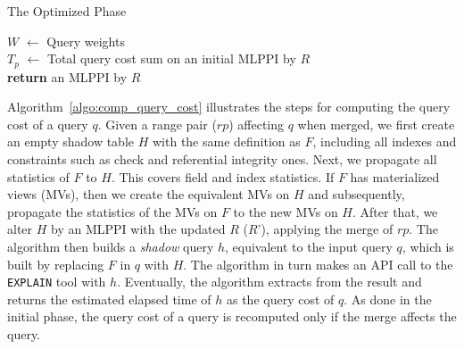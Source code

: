 \documentclass[runningheads]{comsis2}
\begin{document}
\begin{algorithm}[t]
\caption{The Optimized Phase}
\label{algo:opt_phase}
{
	$W$ $\leftarrow$ Query weights \\
	$T_{p}$ $\leftarrow$ Total query cost sum on an initial MLPPI by $R$ \\
	{\bf return} an MLPPI by $R$ \;
}
\end{algorithm}

Algorithm~\ref{algo:comp_query_cost} illustrates the steps for computing the query cost of a query $q$. 
Given a range pair ($rp$) affecting $q$ when merged, 
we first create an empty shadow table $H$ with the same definition as $F$, 
including all indexes and constraints such as check and referential integrity 
ones. Next, we propagate all statistics of $F$ to $H$. 
This covers field and index statistics. 
If $F$ has materialized views (MVs), then we create the equivalent MVs on $H$ and subsequently, 
propagate the statistics of the MVs on $F$ to the new MVs on $H$. 
After that, we alter $H$ by an MLPPI with the updated $R$ ($R$'), applying the merge of $rp$. 
The algorithm then builds a {\em shadow} query $h$, equivalent to the input query $q$,
which is built by replacing $F$ in $q$ with $H$. 
The algorithm in turn makes an API call to the {\tt EXPLAIN} tool with $h$. 
Eventually, the algorithm extracts from the result and returns the estimated elapsed time 
of $h$ as the query cost of $q$. 
As done in the initial phase, the query cost of a query is recomputed only if the merge affects the query.
\end{document}
